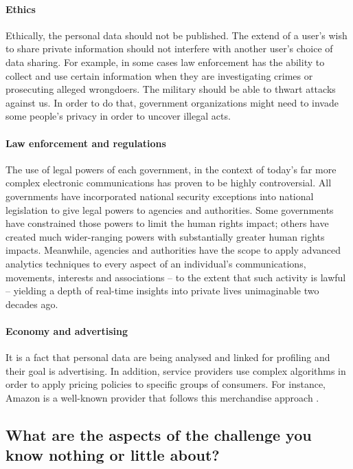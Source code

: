 \paragraph{Ethics}
Ethically, the personal data should not be published. The extend of a user's 
wish to share private information should not interfere with another user's 
choice of data sharing.  For example, in some cases law enforcement has the 
ability to collect and use certain information when they are investigating 
crimes or prosecuting alleged wrongdoers. The military  should  be able to 
thwart attacks against us. In order to do that, government organizations might 
need to invade some people's privacy in order to uncover illegal acts. 

\paragraph{Law enforcement and regulations}
The use of legal powers of each government, in the context of today's far more 
complex electronic communications has proven to be highly controversial. 
All governments have incorporated national security exceptions into national 
legislation to give legal powers to agencies and authorities. Some governments 
have constrained those powers to limit the human rights impact; others have 
created much wider-ranging powers with substantially greater human rights 
impacts. Meanwhile, agencies and authorities have the scope to apply advanced 
analytics techniques to every aspect of an individual's communications, 
movements, interests and associations – to the extent that such activity is 
lawful – yielding a depth of real-time insights into private lives unimaginable 
two decades ago.

\paragraph{Economy and advertising}
It is a fact that personal data are being analysed and linked for profiling and 
their goal is advertising. In addition, service providers use complex algorithms
in order to apply pricing policies to specific groups of consumers. 
For instance, Amazon is a well-known provider that follows this merchandise 
approach \cite{chen2016empirical}. 

\subsection{What are the aspects of the challenge you know nothing or little 
about?}

